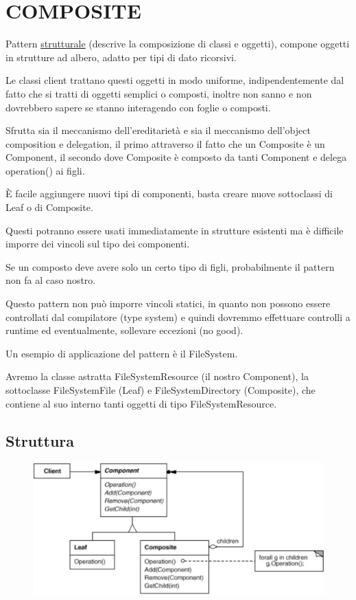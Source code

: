 \chapter{COMPOSITE}

Pattern \underline{strutturale} (descrive la composizione di classi e oggetti), compone oggetti in strutture ad albero, adatto per tipi di dato ricorsivi.

Le classi client trattano questi oggetti in modo uniforme, indipendentemente dal fatto che si tratti di oggetti semplici o composti, inoltre non sanno e non dovrebbero
sapere se stanno interagendo con foglie o composti.

Sfrutta sia il meccanismo dell'ereditarietà e sia il meccanismo dell'object composition e delegation, il primo attraverso il fatto che un Composite è un Component, il 
secondo dove Composite è composto da tanti Component e delega operation() ai figli.

È facile aggiungere nuovi tipi di componenti, basta creare nuove sottoclassi di Leaf o di Composite.

Questi potranno essere usati immediatamente in strutture esistenti ma è difficile imporre dei vincoli sul tipo dei componenti.

Se un composto deve avere solo un certo tipo di figli, probabilmente il pattern non fa al caso nostro.

Questo pattern non può imporre vincoli statici, in quanto non possono essere controllati dal compilatore (type system) e quindi dovremmo effettuare controlli a runtime
ed eventualmente, sollevare eccezioni (no good).

Un esempio di applicazione del pattern è il FileSystem.

Avremo la classe astratta FileSystemResource (il nostro Component), la sottoclasse FileSystemFile (Leaf) e FileSystemDirectory (Composite), che contiene al suo interno
tanti oggetti di tipo FileSystemResource.

\section{Struttura}

\begin{figure}[H]
    \centering
    \includegraphics[width=0.5\linewidth]{../../immagini/composite/struttura_composite}
\end{figure}

